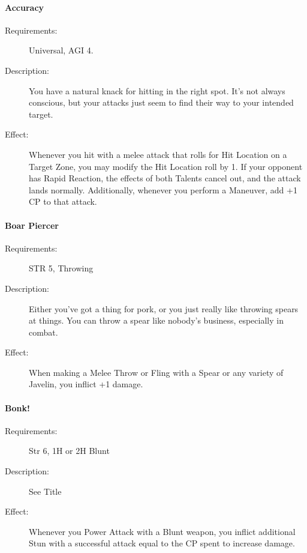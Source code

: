 \documentclass[oneside,11pt,english]{book}
\begin{document}
\paragraph{Accuracy}\label{talent:Accuracy}
\begin{description}
\item [Requirements:] Universal, AGI 4. 
\item [Description:] You have a natural knack for hitting in the right spot.
  It's not always conscious, but your attacks just seem to find their way to
  your intended target.  
\item [Effect:] Whenever you hit with a melee attack that rolls for Hit Location
  on a Target Zone, you may modify the Hit Location roll by 1. If your opponent
  has Rapid Reaction, the effects of both Talents cancel out, and the attack
  lands normally. Additionally, whenever you perform a  Maneuver, add +1 CP to that attack.   
\end{description}
\paragraph{Boar Piercer}\label{talent:Boar Piercer}
\begin{description}
\item [Requirements:] STR 5, Throwing 
\item [Description:] Either you’ve got a thing for pork, or you just really like throwing spears at things. You can 
  throw a spear like nobody’s business, especially in combat. 
\item [Effect:] When making a Melee Throw or Fling with a Spear or any variety of Javelin, you inflict +1 
  damage. 
\end{description}
\paragraph{Bonk!}\label{talent:Bonk!}
\begin{description}
\item [Requirements:] Str 6, 1H or 2H Blunt 
\item [Description:] See Title 
\item [Effect:] Whenever you Power Attack with a Blunt weapon, you inflict additional Stun with a successful attack equal to the CP spent to increase damage. 
\end{description}
\end{document}
